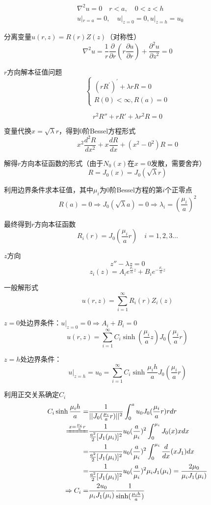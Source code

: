 \begin{ex}
    $$\begin{aligned}
        &\nabla^{2}u=0\quad r<a,\quad0<z<h\\
        &u|_{r=a}=0,\quad u|_{z=0}=0,u|_{z=h}=u_{0}
    \end{aligned}$$

\noindent 分离变量$u(r,z)=R(r)Z(z)$（对称性）
$$\nabla^{2}u=\frac{1}{r}\frac{\partial}{\partial r}(r\frac{\partial u}{\partial r})+\frac{\partial^2 u}{\partial z^{2}}=0$$

\noindent $r$方向解本征值问题
$$\begin{cases}
    (rR^{\prime})^{\prime}+\lambda rR=0\\
    R(0)<\infty,R(a)=0
\end{cases}$$

$$r^{2}R''+rR'+\lambda r^{2}R=0$$

变量代换$x=\sqrt{\lambda}r$，得到0阶Bessel方程形式
$$x^{2}\frac{d^{2}R}{dx^{2}}+x\frac{dR}{dx}+(x^{2}-0^{2})R=0$$

解得$r$方向本征函数的形式（由于$N_0(x)$在$x=0$发散，需要舍弃）
$$R=J_0(x)=J_0(\sqrt{\lambda}r)$$

利用边界条件求本征值，其中$\mu_i$为0阶Bessel方程的第$i$个正零点
$$R(a)=0\Rightarrow J_{0}(\sqrt{\lambda}a)=0\Rightarrow\lambda_{i}=(\frac{\mu_{i}}{a})^{2}$$

最终得到$r$方向本征函数
$$R_{i}(r)=J_{0}\left(\frac{\mu_{i}}{a}r\right)\quad i=1,2,3\ldots$$

\noindent $z$方向
$$z''-\lambda z=0$$
$$z_{i}(z)=A_{i}e^{\frac{\mu_{i}}{\alpha}z}+B_{i}e^{-\frac{\mu_{i}}{\alpha}z}$$

\noindent 一般解形式
$$u(r,z)=\sum_{i=1}^{\infty}R_{i}(r)Z_{i}(z)$$

$z=0$处边界条件：$u|_{z=0}=0\Rightarrow A_i+B_i=0$
$$u(r,z)=\sum_{i=1}^{\infty}C_{i}\sinh(\frac{\mu_{i}}{a}z)J_{0}(\frac{\mu_{i}}{a}r)$$

$z=h$处边界条件：
$$u|_{z=h}=u_{0}=\sum_{i=1}^{\infty}C_{i}\sinh\frac{\mu_{i}h}{a}J_{0}(\frac{\mu_{i}}{a}r)$$

利用正交关系确定$C_i$
$$\begin{aligned}
    C_{i}\sinh\frac{\mu_{i}h}{a}=&\frac{1}{||J_{0}(\frac{\mu_{i}}{a}r)||^{2}}\int_{0}^{a}u_{0}J_{0}(\frac{\mu_{i}}{a}r)rdr\\
    \xlongequal{x=\frac{\mu_{i}}{a}r}&\frac{1}{\frac{a^{2}}{2}[J_{1}(\mu_{i})]^{2}}u_{0}(\frac{a}{\mu_{i}})^{2}\int_{0}^{\mu_{i}}J_{0}(x)xdx\\
    =&\frac{1}{\frac{a^{2}}{2}[J_{1}(\mu_{i})]^{2}}u_{0}(\frac{a}{\mu_{i}})^{2}\int_{0}^{\mu_{i}}\frac{d}{dx}(xJ_1)dx\\
    =&\frac{1}{\frac{a^{2}}{2}[J_{1}(\mu_{i})]^{2}}u_{0}(\frac{a}{\mu_{i}})^{2}\mu_{i}J_{1}(\mu_{i})=\frac{2\mu_{0}}{\mu_{i}J_{1}(\mu_{i})}\\
   \Rightarrow C_i=&\frac{2u_{0}}{\mu_{i}J_{1}(\mu_{i})}\frac{1}{\sinh(\frac{\mu_{i}h}{a})}
\end{aligned}$$


\end{ex}
